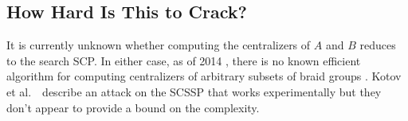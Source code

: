 \documentclass[11pt]{article}
\begin{document}
\subsection*{How Hard Is This to Crack?}
It is currently unknown whether computing the centralizers of $A$ and $B$ reduces to the search SCP. In either case, as of 2014 \cite{ktv14}, there is no known efficient algorithm for computing centralizers of arbitrary subsets of braid groups . Kotov et al.\ \cite{kmmpu18}\ describe an attack on the SCSSP that works experimentally but they don't appear to provide a bound on the complexity.

\printbibliography
\end{document}
